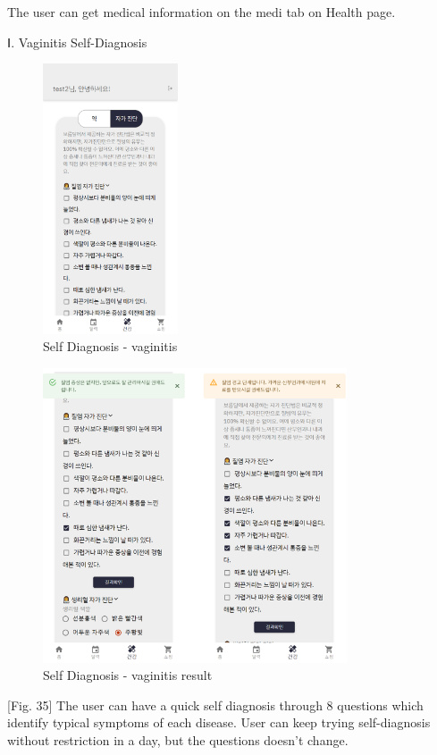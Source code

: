 \documentclass[conference]{IEEEtran}
\begin{document}
\begin{itemize}
\begin{enumerate}
        The user can get medical information on the medi tab on Health page.
        
        Ⅰ. Vaginitis Self-Diagnosis
        
        \begin{figure}[ht]
        \includegraphics[width=4cm, height=8cm, center]{vaginitis.png}
        \caption{Self Diagnosis - vaginitis}
        \label{fig35}
        \end{figure}
        
        \begin{figure}[ht]
        \includegraphics[width=9cm, center]{vagi.png}
        \caption{Self Diagnosis - vaginitis result}
        \label{fig36}
        \end{figure}
        
        [Fig. 35] The user can have a quick self diagnosis through 8 questions which identify typical symptoms of each disease. 
        User can keep trying self-diagnosis without restriction in a day, but the questions doesn't change.
        

\end{enumerate}
\end{itemize}
\end{document}
